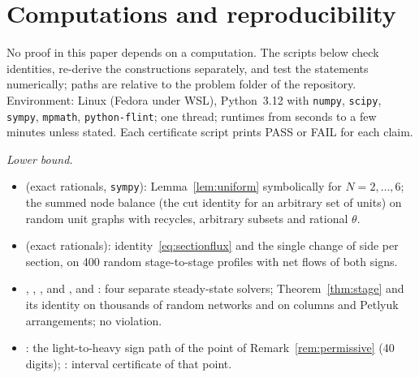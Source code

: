 \documentclass[11pt,a4paper]{report}
\begin{document}
\section{Computations and reproducibility}\label{app:repro}

No proof in this paper depends on a computation. The scripts below check identities, re-derive the constructions
separately, and test the statements numerically; paths are relative to the problem folder
 of the repository. Environment: Linux (Fedora under WSL), Python~3.12
with \texttt{numpy}, \texttt{scipy}, \texttt{sympy}, \texttt{mpmath}, \texttt{python-flint}; one thread; runtimes from seconds to a few
minutes unless stated. Each certificate script prints PASS or FAIL for each claim.

\emph{Lower bound.}
\begin{itemize}
\item {} (exact rationals, \texttt{sympy}): Lemma~\ref{lem:uniform} symbolically
for \(N=2,\dots,6\); the summed node balance (the cut identity for an arbitrary set of units) on random unit graphs with recycles,
arbitrary subsets and rational \(\theta\).
\item {} (exact rationals): identity~\eqref{eq:sectionflux} and the single change of
side per section, on 400 random stage-to-stage profiles with net flows of both signs.
\item {}, ,
,  and
,  and : four separate
steady-state solvers; Theorem~\ref{thm:stage} and its identity on thousands of random networks and on columns and Petlyuk
arrangements; no violation.
\item {}: the light-to-heavy sign path of the point of
Remark~\ref{rem:permissive} (40 digits); : interval certificate of that point.
\end{itemize}
\end{document}

